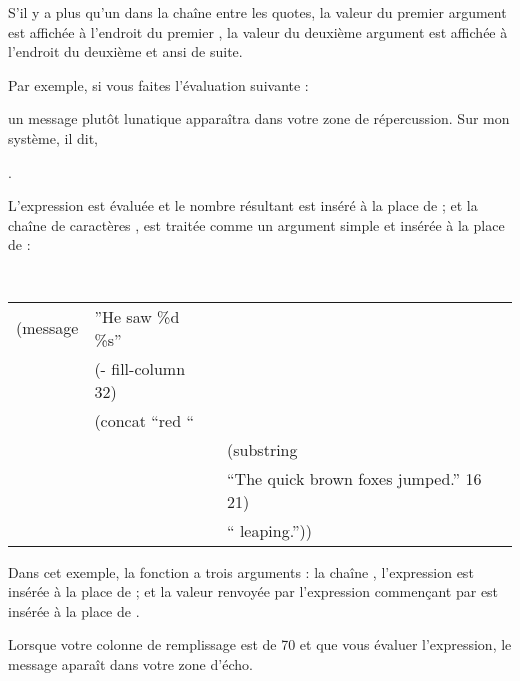 S'il y a plus qu'un  dans la chaîne entre les quotes, la
valeur du premier argument est affichée à l'endroit du premier
, la valeur du deuxième argument est affichée à l'endroit du
deuxième  et ansi de suite.

Par exemple, si vous faites l'évaluation suivante : 


\hspace{1.5cm}

un message plutôt lunatique apparaîtra dans votre zone de
répercussion. Sur mon système, il dit, 

.

L'expression  est évaluée et le nombre
résultant est inséré à la place de ; et la chaîne de
caractères , est traitée comme un argument
simple et insérée à la place de  :

{\tt 
  \begin{center}
    \begin{tabular}[m]{*{3}l}
      (message &''He saw \%d \%s''  & \\
               & (- fill-column 32) & \\
               & (concat ``red ``   & \\
               &                    & (substring \\
               &                    & ``The quick brown foxes
                                      jumped.'' 16 21) \\
               &                    & `` leaping.''))
    \end{tabular}
  \end{center}
 }

Dans cet exemple, la fonction  a trois arguments : la
chaîne , l'expression 
est insérée à la place de ; et la valeur renvoyée par l'expression
commençant par  est insérée à la place de . 

Lorsque votre colonne de remplissage est de 70 et que vous évaluer
l'expression, le message  aparaît
dans votre zone d'écho.

